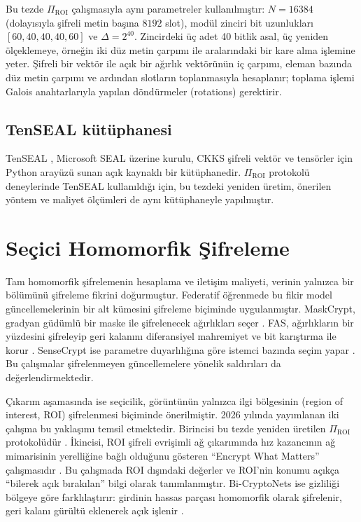 Bu tezde $\Pi_{\mathrm{ROI}}$ çalışmasıyla aynı parametreler kullanılmıştır: $N = 16384$ (dolayısıyla şifreli metin başına $8192$ slot), modül zinciri bit uzunlukları $[60, 40, 40, 40, 60]$ ve $\Delta = 2^{40}$. Zincirdeki üç adet 40 bitlik asal, üç yeniden ölçeklemeye, örneğin iki düz metin çarpımı ile aralarındaki bir kare alma işlemine yeter. Şifreli bir vektör ile açık bir ağırlık vektörünün iç çarpımı, eleman bazında düz metin çarpımı ve ardından slotların toplanmasıyla hesaplanır; toplama işlemi Galois anahtarlarıyla yapılan döndürmeler (rotations) gerektirir.

\subsection{TenSEAL kütüphanesi}\label{sec:tenseal}

TenSEAL \cite{benaissa2021tenseal}, Microsoft SEAL üzerine kurulu, CKKS şifreli vektör ve tensörler için Python arayüzü sunan açık kaynaklı bir kütüphanedir. $\Pi_{\mathrm{ROI}}$ protokolü deneylerinde TenSEAL kullanıldığı için, bu tezdeki yeniden üretim, önerilen yöntem ve maliyet ölçümleri de aynı kütüphaneyle yapılmıştır.

\section{Seçici Homomorfik Şifreleme}\label{sec:selective}

Tam homomorfik şifrelemenin hesaplama ve iletişim maliyeti, verinin yalnızca bir bölümünü şifreleme fikrini doğurmuştur. Federatif öğrenmede bu fikir model güncellemelerinin bir alt kümesini şifreleme biçiminde uygulanmıştır. MaskCrypt, gradyan güdümlü bir maske ile şifrelenecek ağırlıkları seçer \cite{hu2025maskcrypt}. FAS, ağırlıkların bir yüzdesini şifreleyip geri kalanını diferansiyel mahremiyet ve bit karıştırma ile korur \cite{korkmaz2025fas}. SenseCrypt ise parametre duyarlılığına göre istemci bazında seçim yapar \cite{li2025sensecrypt}. Bu çalışmalar şifrelenmeyen güncellemelere yönelik saldırıları da değerlendirmektedir.

Çıkarım aşamasında ise seçicilik, görüntünün yalnızca ilgi bölgesinin (region of interest, ROI) şifrelenmesi biçiminde önerilmiştir. 2026 yılında yayımlanan iki çalışma bu yaklaşımı temsil etmektedir. Birincisi bu tezde yeniden üretilen $\Pi_{\mathrm{ROI}}$ protokolüdür \cite{bakas2026roi}. İkincisi, ROI şifreli evrişimli ağ çıkarımında hız kazancının ağ mimarisinin yerelliğine bağlı olduğunu gösteren ``Encrypt What Matters'' çalışmasıdır \cite{backour2026encrypt}. Bu çalışmada ROI dışındaki değerler ve ROI'nin konumu açıkça ``bilerek açık bırakılan'' bilgi olarak tanımlanmıştır. Bi-CryptoNets ise gizliliği bölgeye göre farklılaştırır: girdinin hassas parçası homomorfik olarak şifrelenir, geri kalanı gürültü eklenerek açık işlenir \cite{yuan2024bicryptonets}.

